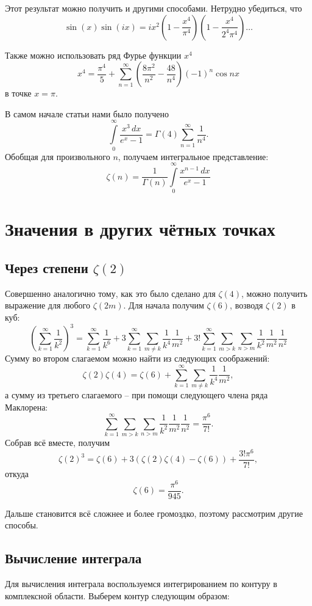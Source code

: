 Этот результат можно получить и другими способами. Нетрудно убедиться, что
\[
    \sin(x)\sin(ix) = ix^2\left(1-\frac{x^4}{\pi^4}\right)\left(1-\frac{x^4}{2^4\pi^4}\right)\ldots
\]

Также можно использовать ряд Фурье функции \( x^4 \)
\[
    x^4 = \frac{\pi^4}{5} + \sum\limits_{n=1}^\infty\left(\frac{8\pi^2}{n^2}-\frac{48}{n^4}\right)(-1)^n\cos nx
\]
в точке \( x=\pi \).

В самом начале статьи нами было получено
\[
    \int\limits_0^\infty \frac{x^3\,dx}{e^x - 1} = \Gamma(4)\sum\limits_{n=1}^\infty\frac{1}{n^4}.
\]
Обобщая для произвольного \( n \), получаем интегральное представление:
\[
    \zeta(n) = \frac{1}{\Gamma(n)}\int\limits_0^\infty \frac{x^{n-1}\,dx}{e^x - 1}
\]

\section{Значения в других чётных точках}

\subsection{Через степени \(\zeta(2)\)}
Совершенно аналогично тому, как это было сделано для \( \zeta(4) \), можно получить выражение для любого \( \zeta(2m) \). Для начала получим \( \zeta(6) \), возводя \( \zeta(2) \) в куб:
\[
    \left(\sum\limits_{k=1}^\infty \frac{1}{k^2}\right)^3 = \sum\limits_{k=1}^\infty \frac{1}{k^{6}} + 3\sum\limits_{k=1}^\infty\sum\limits_{m\ne k} \frac{1}{k^{4}}\frac{1}{m^2} + 3!\sum\limits_{k=1}^\infty\sum\limits_{m>k}\sum\limits_{n>m}\frac{1}{k^2}\frac{1}{m^2}\frac{1}{n^2}
\]
Сумму во втором слагаемом можно найти из следующих соображений:
\[
    \zeta(2)\zeta(4) = \zeta(6) + \sum\limits_{k=1}^\infty\sum\limits_{m\ne k} \frac{1}{k^{4}}\frac{1}{m^2},
\]
а сумму из третьего слагаемого -- при помощи следующего члена ряда Маклорена:
\[
    \sum\limits_{k=1}^\infty\sum\limits_{m>k}\sum\limits_{n>m}\frac{1}{k^2}\frac{1}{m^2}\frac{1}{n^2} = \frac{\pi^6}{7!}.
\]
Собрав всё вместе, получим
\[
    \zeta(2)^3 = \zeta(6) + 3(\zeta(2)\zeta(4)-\zeta(6)) + \frac{3!\pi^6}{7!},
\]
откуда
\[
    \zeta(6) = \frac{\pi^6}{945}.
\]

Дальше становится всё сложнее и более громоздко, поэтому рассмотрим другие способы.

\pagebreak
\subsection{Вычисление интеграла}
Для вычисления интеграла воспользуемся интегрированием по контуру в комплексной области. Выберем контур следующим образом:

